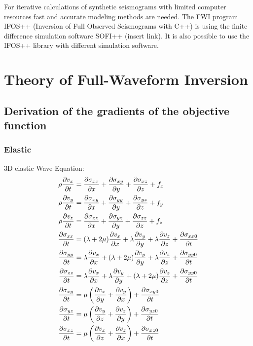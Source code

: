 \documentclass[pdftex,a4paper,parskip,listof=totoc,bibliography=totoc,onehalfspacing,12pt]{scrreprt}
\begin{document}
For iterative calculations of synthetic seismograms with limited computer resources fast and accurate modeling methods are needed. The FWI program IFOS++ (Inversion of Full Observed Seismograms with C++) is using the finite difference simulation software SOFI++ (insert link). It is also possible to use the IFOS++ library with different simulation software.

\cleardoublepage
\part{Theory of Full-Waveform Inversion}
\chapter{Derivation of the gradients of the objective function}

\section{Elastic}
\label{kap:el}

3D elastic Wave Equation:
\begin{align}
\rho\pdv{v_x}{t}&=\pdv{\sigma_{xx}}{x}+\pdv{\sigma_{xy}}{y} + \pdv{\sigma_{xz}}{z}+ f_x\\
\rho\pdv{v_y}{t}&=\pdv{\sigma_{xy}}{x}+\pdv{\sigma_{yy}}{y} + \pdv{\sigma_{yz}}{z} + f_y\\
\rho\pdv{v_z}{t}&=\pdv{\sigma_{xz}}{x}+\pdv{\sigma_{yz}}{y} + \pdv{\sigma_{zz}}{z} + f_z\\
\pdv{\sigma_{xx}}{t} &= (\lambda+2\mu) \pdv{v_x}{x} + \lambda \pdv{v_y}{y} + \lambda \pdv{v_z}{z} + \pdv{\sigma_{xx0}}{t}\\
\pdv{\sigma_{yy}}{t} &= \lambda \pdv{v_x}{x} + (\lambda+2\mu) \pdv{v_y}{y} + \lambda \pdv{v_z}{z} + \pdv{\sigma_{yy0}}{t}\\
\pdv{\sigma_{zz}}{t} &= \lambda \pdv{v_x}{x} +  \lambda \pdv{v_y}{y} + (\lambda+2\mu) \pdv{v_z}{z} + \pdv{\sigma_{yy0}}{t}\\
\pdv{\sigma_{xy}}{t} &= \mu \left(\pdv{v_x}{y} +\pdv{v_y}{x}\right) + \pdv{\sigma_{xy0}}{t}\\
\pdv{\sigma_{yz}}{t} &= \mu \left(\pdv{v_y}{z} +\pdv{v_z}{y}\right) + \pdv{\sigma_{yz0}}{t}\\
\pdv{\sigma_{xz}}{t} &= \mu \left(\pdv{v_x}{z} +\pdv{v_z}{x}\right) + \pdv{\sigma_{xz0}}{t}
\end{align}
\end{document}
